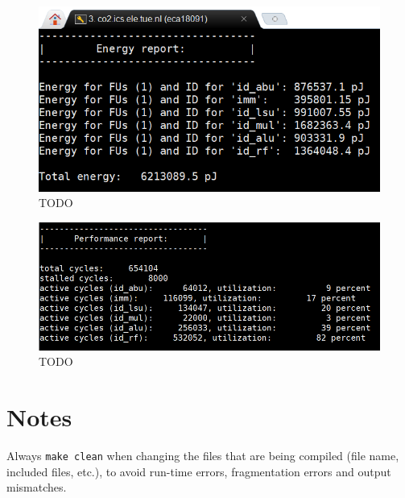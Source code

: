 \documentclass[letterpaper, 10 pt, conference]{ieeeconf}  %
\begin{document}
\begin{figure}[h]
\begin{center}
\includegraphics[scale=0.35]{images/O201.png}
\caption{TODO}
\label{fig:TODO5}
\end{center}
\end{figure}

\begin{figure}[h]
\begin{center}
\includegraphics[scale=0.35]{images/O202.png}
\caption{TODO}
\label{fig:TODO6}
\end{center}
\end{figure}













\section{Notes}
Always \texttt{make clean} when changing the files that are being compiled (file name, included files, etc.), to avoid run-time errors, fragmentation errors and output mismatches.

\addtolength{\textheight}{-12cm}   %
\end{document}
